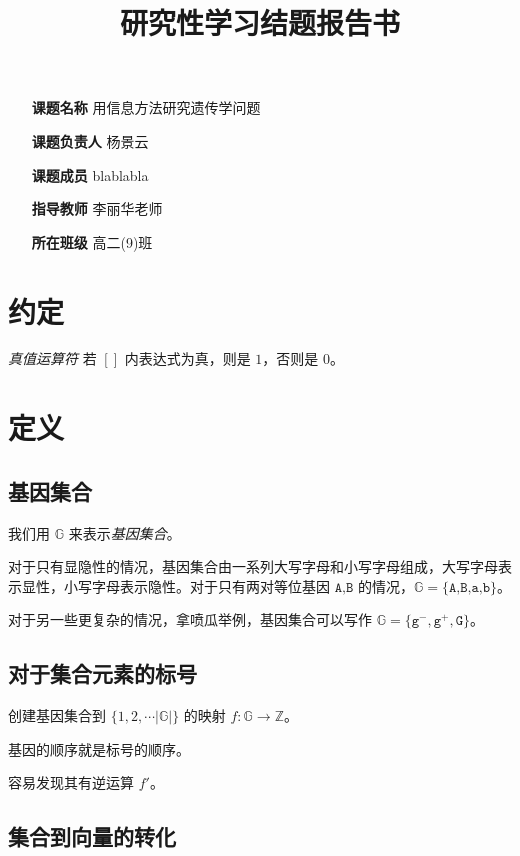 \documentclass{article}
\title{研究性学习结题报告书}
\author{}
\begin{document}
\maketitle
\begin{itemize}
	\item[\textbf{课题名称}] 用信息方法研究遗传学问题 \centering
	\item[\textbf{课题负责人}] 杨景云
	\item[\textbf{课题成员}] blablabla
	\item[\textbf{指导教师}] 李丽华老师
	\item[\textbf{所在班级}] 高二(9)班
\end{itemize}
\newpage
\section{约定}

\textsl{真值运算符} \qquad 若 $[]$ 内表达式为真，则是 $1$，否则是 $0$。
		 
\section{定义}

\subsection{基因集合}

我们用 $\mathbb{G}$ 来表示\textsl{基因集合}。

对于只有显隐性的情况，基因集合由一系列大写字母和小写字母组成，大写字母表示显性，小写字母表示隐性。对于只有两对等位基因 $\texttt{A,B}$ 的情况，$\mathbb{G}=\{\texttt{A,B,a,b}\}$。

对于另一些更复杂的情况，拿喷瓜举例，基因集合可以写作 $\mathbb{G}=\{\texttt{g}^{-},\texttt{g}^{+},\texttt{G}\}$。

\subsection{对于集合元素的标号}

创建基因集合到 $\{1,2,\cdots |\mathbb{G}|\}$ 的映射 $f:\mathbb{G} \to \mathbb{Z}$。

基因的顺序就是标号的顺序。

容易发现其有逆运算 $f'$。

\subsection{集合到向量的转化}
\end{document}
